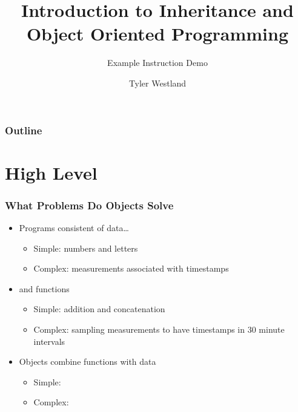 \documentclass{beamer}
\title[Intro to Inheritance \& OOP]{Introduction to Inheritance and Object Oriented Programming}
\subtitle{Example Instruction Demo}
\author{Tyler Westland}
\date{}
\begin{document}
 
\begin{frame}
\titlepage
\end{frame}

\begin{frame}
\frametitle{Outline}
\tableofcontents
\end{frame}

\section{High Level}
  \begin{frame}
    \frametitle{What Problems Do Objects Solve}
    \begin{itemize}
      \item<1-> Programs consistent of data\ldots
        \begin{itemize}
          \item Simple: numbers and letters
          \item Complex: measurements associated with timestamps
        \end{itemize}
      \item<2-> and functions
        \begin{itemize} \item Simple: addition and concatenation
          \item Complex: sampling measurements to have timestamps in 30 minute intervals
        \end{itemize}
      \item<3-> Objects combine functions with data
        \begin{itemize}
          \item Simple:
          \item Complex: 
        \end{itemize}
    \end{itemize}
  \end{frame}
\end{document}
